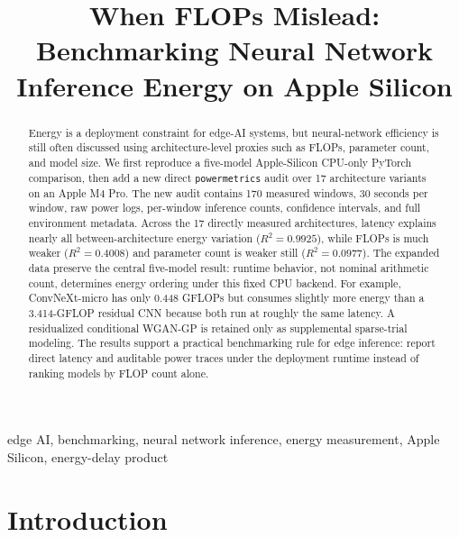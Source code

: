 \documentclass[conference]{IEEEtran}
\begin{document}
\title{When FLOPs Mislead: Benchmarking Neural Network Inference Energy on Apple Silicon}

\author{
}

\maketitle

\begin{abstract}
Energy is a deployment constraint for edge-AI systems, but neural-network
efficiency is still often discussed using architecture-level proxies such as
FLOPs, parameter count, and model size. We first reproduce a five-model
Apple-Silicon CPU-only PyTorch comparison, then add a new direct
\texttt{powermetrics} audit over 17 architecture variants on an Apple M4 Pro.
The new audit contains 170 measured windows, 30 seconds per window, raw power
logs, per-window inference counts, confidence intervals, and full environment
metadata. Across the 17 directly measured architectures, latency explains
nearly all between-architecture energy variation ($R^2=0.9925$), while FLOPs
is much weaker ($R^2=0.4008$) and parameter count is weaker still
($R^2=0.0977$). The expanded data preserve the central five-model result:
runtime behavior, not nominal arithmetic count, determines energy ordering
under this fixed CPU backend. For example, ConvNeXt-micro has only 0.448
GFLOPs but consumes slightly more energy than a 3.414-GFLOP residual CNN
because both run at roughly the same latency. A residualized conditional
WGAN-GP is retained only as supplemental sparse-trial modeling. The results
support a practical benchmarking rule for edge inference: report direct
latency and auditable power traces under the deployment runtime instead of
ranking models by FLOP count alone.
\end{abstract}

\begin{IEEEkeywords}
edge AI, benchmarking, neural network inference, energy measurement, Apple
Silicon, energy-delay product
\end{IEEEkeywords}

\section{Introduction}
\end{document}
